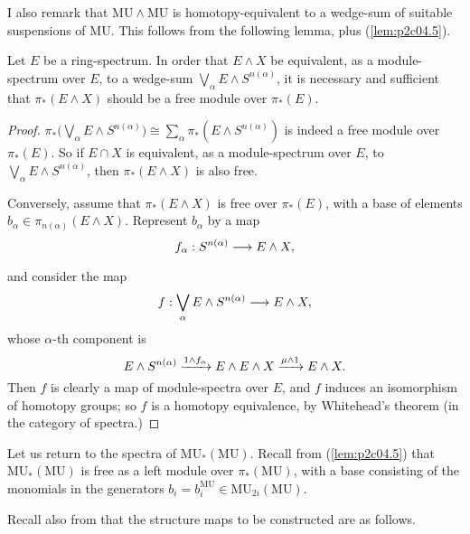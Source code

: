 \documentclass[../main]{subfiles}
\begin{document}
I also remark that $\mathrm{MU} \wedge \mathrm{MU}$ is homotopy-equivalent to a wedge-sum of suitable suspensions of $\mathrm{MU}$. This follows from the following lemma, plus (\ref{lem:p2c04.5}).
\begin{lemma}
\label{lem:p2c11.1}
Let $E$ be a ring-spectrum. In order that $E \wedge X$ be equivalent, as a module-spectrum over $E$, to a wedge-sum $\displaystyle \bigvee_\alpha E \wedge S^{n(\alpha)}$, it is necessary and sufficient that $\pi_\ast(E \wedge X)$ should be a free module over $\pi_\ast(E)$.
\end{lemma}

\begin{proof}
$\displaystyle \pi_\ast \bigg(\bigvee_\alpha E \wedge S^{n(\alpha)}\bigg) \cong \sum_\alpha \pi_\ast(E \wedge S^{n(\alpha)})$ is indeed a free module over $\pi_\ast(E)$. So if $E \cap X$ is equivalent, as a module-spectrum over $E$, to $\displaystyle \bigvee_\alpha E \wedge S^{n(\alpha)}$, then $\pi_\ast(E \wedge X)$ is also free.

Conversely, assume that $\pi_\ast(E \wedge X)$ is free over $\pi_\ast(E)$, with a base of elements $b_\alpha \in \pi_{n(\alpha)} (E \wedge X)$. Represent $b_\alpha$ by a map \[f_\alpha : S^{n(\alpha)} \lar{} E \wedge X,\] and consider the map \[\displaystyle f : \bigvee_\alpha E \wedge S^{n(\alpha)} \lar{} E \wedge X,\] whose $\alpha$-th component is \[E \wedge S^{n(\alpha)} \lar{1 \wedge f_\alpha} E \wedge E \wedge X \lar{\mu \wedge 1} E \wedge X.\] Then $f$ is clearly a map of module-spectra over $E$, and $f$ induces an isomorphism of homotopy groups; so $f$ is a homotopy equivalence, by Whitehead's theorem (in the category of spectra.) 
\end{proof}

Let us return to the spectra of $\mathrm{MU}_\ast(\mathrm{MU})$. Recall from (\ref{lem:p2c04.5}) that $\mathrm{MU}_\ast(\mathrm{MU})$ is free as a left module over $\pi_\ast(\mathrm{MU})$, with a base consisting of the monomials in the generators $b_i = b_i^{\mathrm{MU}} \in \mathrm{MU}_{2i}(\mathrm{MU})$.

Recall also from \cite[p.~61]{adams3} that the structure maps to be constructed are as follows. 
\end{document}
